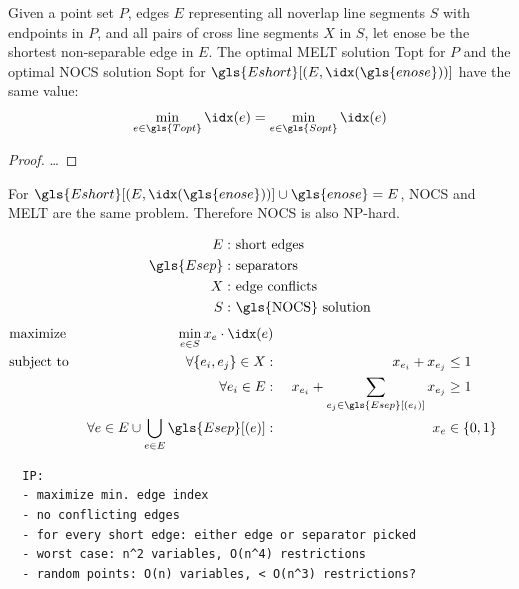 
\begin{theorem}
  Given a point set \(P\), edges \(E\) representing all
  \gls{noverlap} line segments \(S\) with endpoints in \(P\), and
  all pairs of \gls{cross} line segments \(X\) in \(S\), let
  \gls{enose} be the shortest non-separable edge in \(E\).
  The optimal \gls{MELT} solution \gls{Topt} for \(P\) 
  and the optimal \gls{NOCS} solution \gls{Sopt} for
  \(\gls{Eshort}[(E,\idx(\gls{enose}))]\) have the same value:
  \[
    \min\limits_{e \in \gls{Topt}} \idx(e)
    = \min\limits_{e \in \gls{Sopt}} \idx(e)
  \]
\end{theorem}

\begin{proof}
  \ldots{}
\end{proof}


\begin{theorem}
  For \(\gls{Eshort}[(E,\idx(\gls{enose}))] \cup \gls{enose} = E\),
  \gls{NOCS} and \gls{MELT} are the same problem. Therefore \gls{NOCS}
  is also NP-hard.
\end{theorem}


\begin{problem}
  \hfill
  \begin{alignat*}{1}
    E: &~ \text{short edges} \\
    \gls{Esep}: &~ \text{separators} \\
    X: &~ \text{edge conflicts} \\
    S: &~ \text{\gls{NOCS} solution}
  \end{alignat*}
  \begin{alignat*}{3}
    &\text{maximize } & \min\limits_{e \in S} x_e \cdot \idx(e) \\
    &\text{subject to } & \forall \{e_i,e_j\} \in X : &~& x_{e_i} + x_{e_j} &\leq 1 \\
    && \forall e_i \in E : &~
      & x_{e_i} + \sum\limits_{e_j \in \gls{Esep}[(e_i)]} x_{e_j} &\geq 1 \\
    && \forall e \in E
      \cup \bigcup\limits_{e \in E} \gls{Esep}[(e)] :
      &~& x_e &\in \{0,1\}
  \end{alignat*}
\end{problem}

\begin{verbatim}
  IP:
  - maximize min. edge index
  - no conflicting edges
  - for every short edge: either edge or separator picked
  - worst case: n^2 variables, O(n^4) restrictions
  - random points: O(n) variables, < O(n^3) restrictions?
\end{verbatim}


